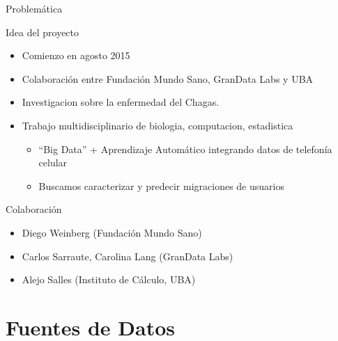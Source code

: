 \documentclass{beamer}
\begin{document}
\begin{frame}{Problemática}
	
	\begin{block}{Idea del proyecto}
		\begin{itemize}
			
			\item Comienzo en agosto 2015 
			\item Colaboración entre Fundación Mundo Sano, GranData Labs y UBA
			\item Investigacion sobre la enfermedad del Chagas.
			\item Trabajo multidisciplinario de biologia, computacion, estadistica
			\begin{itemize}
				\item ``Big Data'' + Aprendizaje Automático integrando datos de telefonía celular
				\item  Buscamos caracterizar y predecir migraciones de usuarios
			\end{itemize}
		\end{itemize}
		
	\end{block}
	
	\pause
	
	\begin{block}{ Colaboración}
		\begin{itemize}
			\item Diego Weinberg (Fundación Mundo Sano)
			\item Carlos Sarraute, Carolina Lang (GranData Labs)
			\item Alejo Salles (Instituto de Cálculo, UBA)
		\end{itemize}
	\end{block}
	
\end{frame}


\section{Fuentes de Datos }
\end{document}

